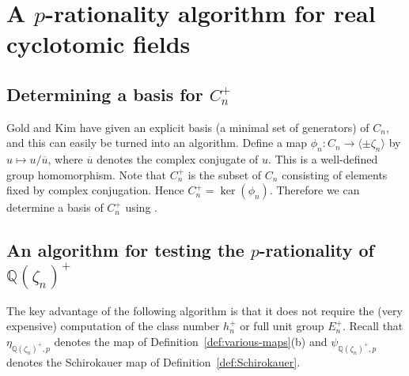 \documentclass[12pt, a4paper, usenames]{amsart}
\newcommand{\Q}{\mathbb{Q}}
\theoremstyle{plain}
\theoremstyle{remark}
\theoremstyle{definition}
\begin{document}
\section{A $p$-rationality algorithm for real cyclotomic fields}\label{sec:alg-real-cyclo}

\subsection{Determining a basis for $C_{n}^{+}$}\label{subsec:basis-for-cyclo-units}
Gold and Kim \cite{MR1008802} have given an explicit basis (a minimal set of generators) of $C_{n}$, and this can easily be turned into an algorithm.
Define a map $\phi_{n} \colon C_{n} \to \langle \pm \zeta_{n} \rangle$ by 
$u \mapsto u/\overline{u}$, where $\overline{u}$ denotes the complex conjugate of $u$. 
This is a well-defined group homomorphism. 
Note that $C_{n}^{+}$ is the subset of $C_{n}$ consisting of elements fixed by complex conjugation.
Hence $C_{n}^{+} = \ker(\phi_{n})$. 
Therefore we can determine a basis of $C_{n}^{+}$ using \cite[Algorithm~4.1.11]{MR1728313}.

\subsection{An algorithm for testing the $p$-rationality of $\Q(\zeta_{n})^{+}$}
\label{subesc:p-rat-Qzeta_n+}
The key advantage of the following algorithm is that 
it does not require the (very expensive) computation of the 
class number $h_{n}^{+}$ or full unit group $E_{n}^{+}$.
Recall that $\eta_{\Q(\zeta_{n})^{+},p}$ denotes the map of 
Definition~\ref{def:various-maps}(b)
and $\psi_{\Q(\zeta_{n})^{+},p}$ denotes the Schirokauer map of 
Definition~\ref{def:Schirokauer}.
\end{document}
